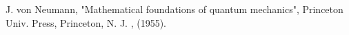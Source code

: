 \setlength{\topmargin}{-1.5cm}
\setlength{\oddsidemargin}{-0.3cm}
\setlength{\evensidemargin}{-0.3cm}
\setlength{\textwidth}{16.5cm}
\setlength{\textheight}{23cm}



%

\begin{thebibliography}{99}
 J. von Neumann, "Mathematical foundations of quantum mechanics", Princeton Univ. Press, Princeton, N. J. , (1955).

% 
\end{thebibliography} 
%